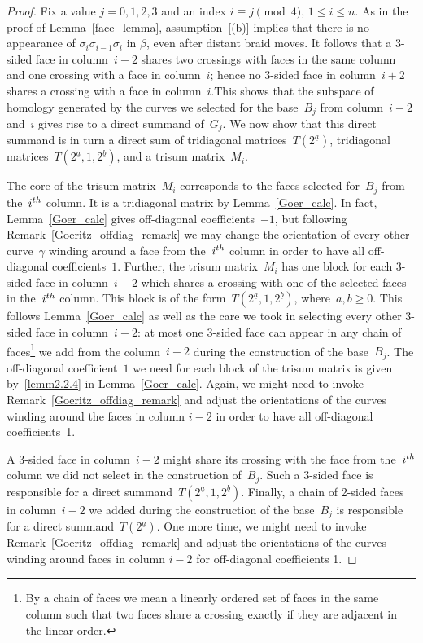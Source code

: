 \documentclass[10pt,a4paper]{amsart}
\numberwithin{equation}{section}
\begin{document}
\begin{proof}
Fix a value $j=0,1,2,3$ and an index $i \equiv j \pmod 4$, $1 \le i \le n$. As in the proof of Lemma~\ref{face_lemma}, assumption~\eqref{(b)} implies that there is no appearance of $\sigma_{i}\sigma_{i-1}\sigma_{i}$ in $\beta$, even after distant braid moves. It follows that a 3-sided face in column~$i-2$ shares two crossings with faces in the same column and one crossing with a face in column~$i$; hence no 3-sided face in column~$i+2$ shares a crossing with a face in column~$i$.This shows that the subspace of homology generated by the curves we selected for the base~$B_j$ from column~$i-2$ and~$i$ gives rise to a direct summand of~$G_j$. We now show that this direct summand is in turn a direct sum of tridiagonal matrices~$T(2^{\underline a})$, tridiagonal matrices~$T(2^{\underline a},1,2^{\underline b})$, and a trisum matrix~$M_i$.


The core of the trisum matrix~$M_i$ corresponds to the faces selected for~$B_j$ from the~$i^{\rm th}$ column. It is a tridiagonal matrix by Lemma~\ref{Goer_calc}. In fact, Lemma~\ref{Goer_calc} gives off-diagonal coefficients~$-1$, but following Remark~\ref{Goeritz_offdiag_remark} we may change the orientation of every other curve~$\gamma$ winding around a face from the~$i^{\rm th}$ column in order to have all off-diagonal coefficients~$1$. Further, the trisum matrix~$M_i$ has one block for each 3-sided face in column~$i - 2$ which shares a crossing with one of the selected faces in the~$i^{\rm th}$ column. This block is of the form~$T(2^{\underline a},1,2^{\underline b})$, where~$a,b\ge0$. This follows Lemma~\ref{Goer_calc} as well as the care we took in selecting every other 3-sided face in column~$i - 2$: at most one 3-sided face can appear in any chain of faces\footnote{By a chain of faces we mean a linearly ordered set of faces in the same column such that two faces share a crossing exactly if they are adjacent in the linear order.} we add from the column~$i-2$ during the construction of the base~$B_j$. The off-diagonal coefficient~$1$ we need for each block of the trisum matrix is given by~\eqref{lemm2.2.4} in Lemma~\ref{Goer_calc}. Again, we might need to invoke Remark~\ref{Goeritz_offdiag_remark} and adjust the orientations of the curves winding around the faces in column $i-2$ in order to have all off-diagonal coefficients~1.


A 3-sided face in column~$i-2$ might share its crossing with the face from the~$i^{\rm th}$ column we did not select in the construction of~$B_j$. Such a 3-sided face is responsible for a direct summand~$T(2^{\underline a},1,2^{\underline b})$. Finally, a chain of 2-sided faces in column~$i-2$ we added during the construction of the base~$B_j$ is responsible for a direct summand~$T(2^{\underline a})$. One more time, we might need to invoke Remark~\ref{Goeritz_offdiag_remark} and adjust the orientations of the curves winding around faces in column $i-2$ for off-diagonal coefficients 1.
\end{proof}
\end{document}
